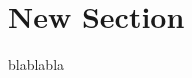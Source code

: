 \documentclass[compress, xcolor=table]{beamer}
\begin{document}
\maketitle
\section{New Section}
\begin{frame}[Frame]
blablabla
\end{frame}
\end{document}
